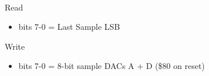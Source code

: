 \\
Read
\begin{itemize}
\item bits 7-0 = \iis Last Sample LSB
\end{itemize}
Write
\begin{itemize}
\item bits 7-0 = 8-bit sample DACs A + D (\$80 on reset)
\end{itemize}

